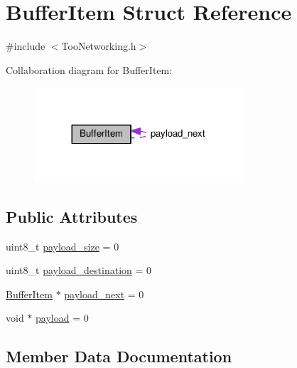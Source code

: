 \hypertarget{structBufferItem}{}\section{Buffer\+Item Struct Reference}
\label{structBufferItem}


{\ttfamily \#include $<$Too\+Networking.\+h$>$}



Collaboration diagram for Buffer\+Item\+:\nopagebreak
\begin{figure}[H]
\begin{center}
\leavevmode
\includegraphics[width=221pt]{structBufferItem__coll__graph}
\end{center}
\end{figure}
\subsection*{Public Attributes}
\begin{DoxyCompactItemize}
\item 
uint8\+\_\+t \hyperlink{structBufferItem_a5c3187c383ceec1825964d5e512273de}{payload\+\_\+size} = 0
\item 
uint8\+\_\+t \hyperlink{structBufferItem_a2e475a18a6671f1f0c4bf3010d7a6e89}{payload\+\_\+destination} = 0
\item 
\hyperlink{structBufferItem}{Buffer\+Item} $\ast$ \hyperlink{structBufferItem_ab20f3ae7cc41c118265557f2c7e2c4f0}{payload\+\_\+next} = 0
\item 
void $\ast$ \hyperlink{structBufferItem_a0ec6d94d7df8c1e9db526fa0200267bb}{payload} = 0
\end{DoxyCompactItemize}


\subsection{Member Data Documentation}
\mbox{\label{structBufferItem_a0ec6d94d7df8c1e9db526fa0200267bb}} 
